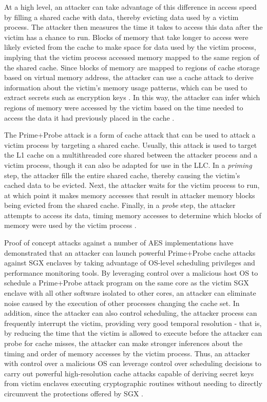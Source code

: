 At a high level, an attacker can take advantage of this difference in access speed by filling a shared cache with data, thereby evicting data used by a victim process. The attacker then measures the time it takes to access this data after the victim has a chance to run. Blocks of memory that take longer to access were likely evicted from the cache to make space for data used by the victim process, implying that the victim process accessed memory mapped to the same region of the shared cache. Since blocks of memory are mapped to regions of cache storage based on virtual memory address, the attacker can use a cache attack to derive information about the victim's memory usage patterns, which can be used to extract secrets such as encryption keys \cite{liu_cache-timing_2013}. In this way, the attacker can infer which regions of memory were accessed by the victim based on the time needed to access the data it had previously placed in the cache \cite{moghimi_cachezoom:_2017, gotzfried_cache_2017}.

The Prime+Probe attack is a form of cache attack that can be used to attack a victim process by targeting a shared cache. Usually, this attack is used to target the L1 cache on a multithreaded core shared between the attacker process and a victim process, though it can also be adapted for use in the LLC. In a \emph{priming} step, the attacker fills the entire shared cache, thereby causing the victim's cached data to be evicted. Next, the attacker waits for the victim process to run, at which point it makes memory accesses that result in attacker memory blocks being evicted from the shared cache. Finally, in a \emph{probe} step, the attacker attempts to access its data, timing memory accesses to determine which blocks of memory were used by the victim process \cite{moghimi_cachezoom:_2017, gotzfried_cache_2017}.

Proof of concept attacks against a number of AES implementations have demonstrated that an attacker can launch powerful Prime+Probe cache attacks against SGX enclaves by taking advantage of OS-level scheduling privileges and performance monitoring tools. By leveraging control over a malicious host OS to schedule a Prime\-+Probe attack program on the same core as the victim SGX enclave with all other software isolated to other cores, an attacker can eliminate noise caused by the execution of other processes changing the cache set. In addition, since the attacker can also control scheduling, the attacker process can frequently interrupt the victim, providing very good temporal resolution - that is, by reducing the time that the victim is allowed to execute before the attacker can probe for cache misses, the attacker can make stronger inferences about the timing and order of memory accesses by the victim process. Thus, an attacker with control over a malicious OS can leverage control over scheduling decisions to carry out powerful high-resolution cache attacks capable of deriving secret keys from victim enclaves executing cryptographic routines without needing to directly circumvent the protections offered by SGX \cite{moghimi_cachezoom:_2017, gotzfried_cache_2017}.

